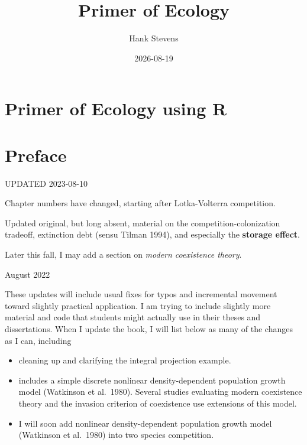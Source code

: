 \documentclass[
  10pt,
  letterpaper,
  nols]{tufte-book}
\title{Primer of Ecology}
\author{Hank Stevens}
\date{2026-08-19}
\providecommand{\tightlist}{%
  \setlength{\itemsep}{0pt}\setlength{\parskip}{0pt}}
\renewcommand*\contentsname{Table of contents}
\newcommand\contentsname{Table of contents}
\begin{document}
\frontmatter
\maketitle

\renewcommand*\contentsname{Table of contents}
{
\hypersetup{linkcolor=}
\setcounter{tocdepth}{2}
\tableofcontents
}

\mainmatter
{}

\chapter{Primer of Ecology using R}\label{primer-of-ecology-using-r}


\chapter*{Preface}\label{preface}


UPDATED 2023-08-10

Chapter numbers have changed, starting after Lotka-Volterra competition.

Updated original, but long absent, material on the
competition-colonization tradeoff, extinction debt (sensu Tilman 1994),
and especially the \textbf{storage effect}.

Later this fall, I may add a section on \emph{modern coexistence
theory}.

August 2022

These updates will include usual fixes for typos and incremental
movement toward slightly practical application. I am trying to include
slightly more material and code that students might actually use in
their theses and dissertations. When I update the book, I will list
below as many of the changes as I can, including

\begin{itemize}
\tightlist
\item
  cleaning up and clarifying the integral projection example.
\item
  includes a simple discrete nonlinear density-dependent population
  growth model (Watkinson et al.~1980). Several studies evaluating
  modern coexistence theory and the invasion criterion of coexistence
  use extensions of this model.
\item
  I will soon add nonlinear density-dependent population growth model
  (Watkinson et al.~1980) into two species competition.
\end{itemize}
\end{document}
